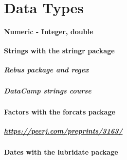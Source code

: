 \documentclass[]{book}
\let\oldparagraph\paragraph
\renewcommand{\paragraph}[1]{\oldparagraph{#1}\mbox{}}
\theoremstyle{definition}
\theoremstyle{definition}
\theoremstyle{definition}
\theoremstyle{remark}
\begin{document}
\hypertarget{data-types}{%
\chapter{Data Types}\label{data-types}}

\hypertarget{numeric---integer-double}{%
\subsubsection{Numeric - Integer,
double}\label{numeric---integer-double}}

\hypertarget{strings-with-the-stringr-package}{%
\subsubsection{Strings with the stringr
package}\label{strings-with-the-stringr-package}}

\hypertarget{rebus-package-and-regex}{%
\paragraph{Rebus package and regex}\label{rebus-package-and-regex}}

\hypertarget{datacamp-strings-course}{%
\paragraph{DataCamp strings course}\label{datacamp-strings-course}}

\hypertarget{factors-with-the-forcats-package}{%
\subsubsection{Factors with the forcats
package}\label{factors-with-the-forcats-package}}

\hypertarget{httpspeerj.compreprints3163}{%
\paragraph{\texorpdfstring{\url{https://peerj.com/preprints/3163/}}{https://peerj.com/preprints/3163/}}\label{httpspeerj.compreprints3163}}

\hypertarget{dates-with-the-lubridate-package}{%
\subsubsection{Dates with the lubridate
package}\label{dates-with-the-lubridate-package}}
\end{document}
